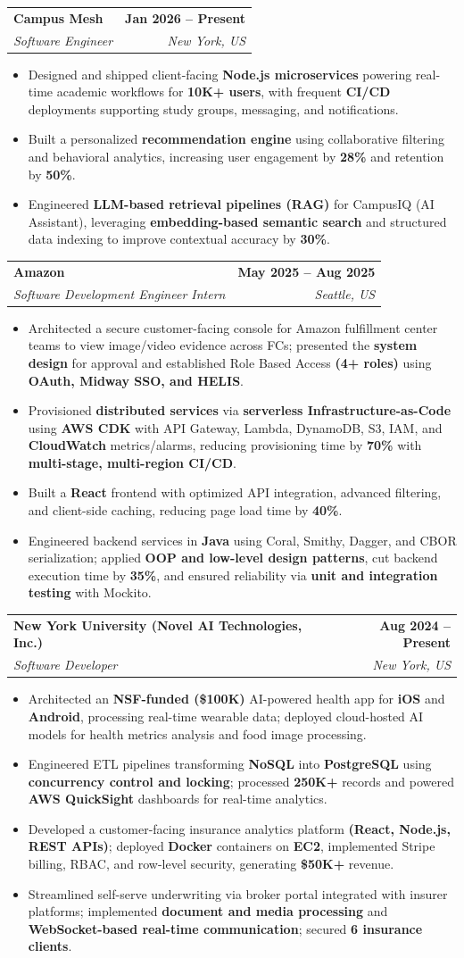 \documentclass[letterpaper,10.5pt]{extarticle}
\makeatletter
\newcommand{\resumeItem}[1]{
\item\small{{#1}\vspace{-3.5pt}}
}
\newcommand{\resumeSubheading}[4]{
\vspace{6pt}
\item
\begin{tabular*}{1.0\textwidth}[t]{l@{\extracolsep{\fill}}r}
\textbf{#1} & \textbf{\small #2} \\
\textit{\small#3} & \textit{\small #4} \\
\end{tabular*}\vspace{-5.5pt}
}
\newcommand{\resumeItemListStart}{\begin{itemize}[leftmargin=*, itemsep=0pt, topsep=0pt]}
\newcommand{\resumeItemListEnd}{\end{itemize}\vspace{-3pt}}
\makeatother
\begin{document}
\resumeSubheading
  {Campus Mesh}{Jan 2026 -- Present}
  {Software Engineer}{New York, US}
\resumeItemListStart
  \resumeItem{Designed and shipped client-facing \textbf{Node.js microservices} powering real-time academic workflows for \textbf{10K+ users}, with frequent \textbf{CI/CD} deployments supporting study groups, messaging, and notifications.}
  \resumeItem{Built a personalized \textbf{recommendation engine} using collaborative filtering and behavioral analytics, increasing user engagement by \textbf{28\%} and retention by \textbf{50\%}.}
  \resumeItem{Engineered \textbf{LLM-based retrieval pipelines (RAG)} for CampusIQ (AI Assistant), leveraging \textbf{embedding-based semantic search} and structured data indexing to improve contextual accuracy by \textbf{30\%}.}
\resumeItemListEnd

\resumeSubheading
  {Amazon}{May 2025 -- Aug 2025}
  {Software Development Engineer Intern}{Seattle, US}
\resumeItemListStart
  \resumeItem{Architected a secure customer-facing console for Amazon fulfillment center teams to view image/video evidence across FCs; presented the \textbf{system design} for approval and established Role Based Access \textbf{(4+ roles)} using \textbf{OAuth, Midway SSO, and HELIS}.}
  \resumeItem{Provisioned \textbf{distributed services} via \textbf{serverless Infrastructure-as-Code} using \textbf{AWS CDK} with API Gateway, Lambda, DynamoDB, S3, IAM, and \textbf{CloudWatch} metrics/alarms, reducing provisioning time by \textbf{70\%} with \textbf{multi-stage, multi-region CI/CD}.}
  \resumeItem{Built a \textbf{React} frontend with optimized API integration, advanced filtering, and client-side caching, reducing page load time by \textbf{40\%}.}
  \resumeItem{Engineered backend services in \textbf{Java} using Coral, Smithy, Dagger, and CBOR serialization; applied \textbf{OOP and low-level design patterns}, cut backend execution time by \textbf{35\%}, and ensured reliability via \textbf{unit and integration testing} with Mockito.}
\resumeItemListEnd

\resumeSubheading
  {New York University (Novel AI Technologies, Inc.)}{Aug 2024 -- Present}
  {Software Developer}{New York, US}
\resumeItemListStart
  \resumeItem{Architected an \textbf{NSF-funded (\$100K)} AI-powered health app for \textbf{iOS} and \textbf{Android}, processing real-time wearable data; deployed cloud-hosted AI models for health metrics analysis and food image processing.}
  \resumeItem{Engineered ETL pipelines transforming \textbf{NoSQL} into \textbf{PostgreSQL} using \textbf{concurrency control and locking}; processed \textbf{250K+} records and powered \textbf{AWS QuickSight} dashboards for real-time analytics.}
  \resumeItem{Developed a customer-facing insurance analytics platform \textbf{(React, Node.js, REST APIs)}; deployed \textbf{Docker} containers on \textbf{EC2}, implemented Stripe billing, RBAC, and row-level security, generating \textbf{\$50K+} revenue.}
  \resumeItem{Streamlined self-serve underwriting via broker portal integrated with insurer platforms; implemented \textbf{document and media processing} and \textbf{WebSocket-based real-time communication}; secured \textbf{6 insurance clients}.}
\resumeItemListEnd
\end{document}
